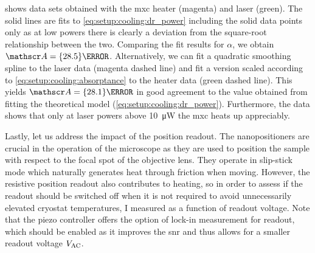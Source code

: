  shows data sets obtained with the \gls{mxc} heater (magenta) and laser (green).
The solid lines are fits to \cref{eq:setup:cooling:dr_power} including the solid data points only as at low powers there is clearly a deviation from the square-root relationship between the two.
Comparing the fit results for $\alpha$, we obtain $\absorptance = \qty{28.5}{\percent}$.
Alternatively, we can fit a quadratic smoothing spline to the laser data (magenta dashed line) and fit a version scaled according to \cref{eq:setup:cooling:absorptance} to the heater data (green dashed line).
This yields $\absorptance = \qty{28.1}{\percent}$ in good agreement to the value obtained from fitting the theoretical model (\cref{eq:setup:cooling:dr_power}).
Furthermore, the data shows that only at laser powers above \qty{10}{\micro\watt} the \gls{mxc} heats up appreciably.

Lastly, let us address the impact of the \positioner position readout.
The nanopositioners are crucial in the operation of the microscope as they are used to position the sample with respect to the focal spot of the objective lens.
They operate in slip-stick mode which naturally generates heat through friction when moving.
However, the resistive position readout also contributes to heating, so in order to assess if the readout should be switched off when it is not required to avoid unnecessarily elevated cryostat temperatures, I measured \Tmxc as a function of readout voltage.
Note that the \positionercontroller piezo controller offers the option of lock-in measurement for readout, which should be enabled as it improves the \gls{snr} and thus allows for a smaller readout voltage $V_{\mathrm{AC}}$.

